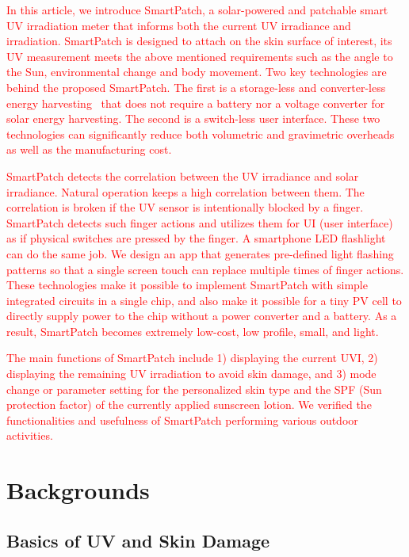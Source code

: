 \documentclass[journal]{IEEEtran}
\begin{document}
\textcolor{red}{In this article, we introduce SmartPatch, a solar-powered and patchable smart UV irradiation meter that informs both the current UV irradiance and irradiation. SmartPatch is designed to attach on the skin surface of interest, its UV measurement meets the above mentioned requirements such as the angle to the Sun, environmental change and body movement. Two key technologies are behind the proposed SmartPatch. The first is a storage-less and converter-less energy harvesting~\cite{Lee:ASPDAC15} that does not require a battery nor a voltage converter for solar energy harvesting. The second is a switch-less user interface. These two technologies can significantly reduce both volumetric and gravimetric overheads as well as the manufacturing cost.}

\textcolor{red}{SmartPatch detects the correlation between the UV irradiance and solar irradiance. Natural operation keeps a high correlation between them. The correlation is broken if the UV sensor is intentionally blocked by a finger. SmartPatch detects such finger actions and utilizes them for UI (user interface) as if physical switches are pressed by the finger. A smartphone LED flashlight can do the same job. We design an app that  generates pre-defined light flashing patterns so that a single screen touch can replace multiple times of finger actions. These technologies make it possible to implement SmartPatch with simple integrated circuits in a single chip, and also make it possible for a tiny PV cell to directly supply power to the chip without a power converter and a battery. As a result, SmartPatch becomes extremely low-cost, low profile, small, and light.}

 \textcolor{red}{The main functions of SmartPatch include 1) displaying the current UVI, 2) displaying the remaining UV irradiation to avoid skin damage, and 3) mode change or parameter setting for the personalized skin type and the SPF (Sun protection factor) of the currently applied sunscreen lotion. We verified the functionalities and usefulness of SmartPatch performing various outdoor activities.}

\section{Backgrounds}

\subsection{Basics of UV and Skin Damage}
\end{document}
